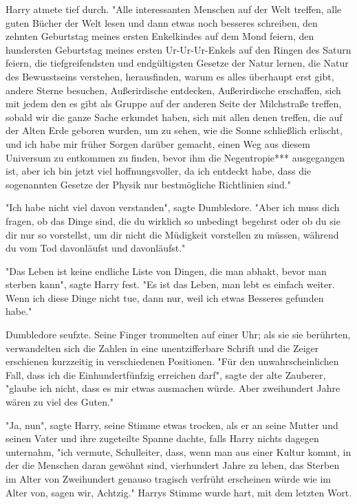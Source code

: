 {Harry atmete tief durch. "Alle interessanten Menschen auf der Welt treffen, alle guten Bücher der Welt lesen und dann etwas noch besseres schreiben, den zehnten Geburtstag meines ersten Enkelkindes auf dem Mond feiern, den hundersten Geburtstag meines ersten Ur-Ur-Ur-Enkels auf den Ringen des Saturn feiern, die tiefgreifendsten und endgültigsten Gesetze der Natur lernen, die Natur des Bewusstseins verstehen, herausfinden, warum es alles überhaupt erst gibt, andere Sterne besuchen, Außerirdische entdecken, Außerirdische erschaffen, sich mit jedem den es gibt als Gruppe auf der anderen Seite der Milchstraße treffen, sobald wir die ganze Sache erkundet haben, sich mit allen denen treffen, die auf der Alten Erde geboren wurden, um zu sehen, wie die Sonne schließlich erlischt, und ich habe mir früher Sorgen darüber gemacht, einen Weg aus diesem Universum zu entkommen zu finden, bevor ihm die Negentropie*** ausgegangen ist, aber ich bin jetzt viel hoffnungsvoller, da ich entdeckt habe, dass die sogenannten Gesetze der Physik nur bestmögliche Richtlinien sind."

"Ich habe nicht viel davon verstanden", sagte Dumbledore. "Aber ich muss dich fragen, ob das Dinge sind, die du wirklich so unbedingt begehrst oder ob du sie dir nur so vorstellst, um dir nicht die Müdigkeit vorstellen zu müssen, während du vom Tod davonläufst und davonläufst."

"Das Leben ist keine endliche Liste von Dingen, die man abhakt, bevor man sterben kann", sagte Harry fest. "Es ist das Leben, man lebt es einfach weiter. Wenn ich diese Dinge nicht tue, dann nur, weil ich etwas Besseres gefunden habe."

Dumbledore seufzte. Seine Finger trommelten auf einer Uhr; als sie sie berührten, verwandelten sich die Zahlen in eine unentzifferbare Schrift und die Zeiger erschienen kurzzeitig in verschiedenen Positionen. "Für den unwahrscheinlichen Fall, dass ich die Einhundertfünfzig erreichen darf", sagte der alte Zauberer, "glaube ich nicht, dass es mir etwas ausmachen würde. Aber zweihundert Jahre wären zu viel des Guten."

"Ja, nun", sagte Harry, seine Stimme etwas trocken, als er an seine Mutter und seinen Vater und ihre zugeteilte Spanne dachte, falls Harry nichts dagegen unternahm, "ich vermute, Schulleiter, dass, wenn man aus einer Kultur kommt, in der die Menschen daran gewöhnt sind, vierhundert Jahre zu leben, das Sterben im Alter von Zweihundert genauso tragisch verfrüht erscheinen würde wie im Alter von, sagen wir, Achtzig." Harrys Stimme wurde hart, mit dem letzten Wort.

}
